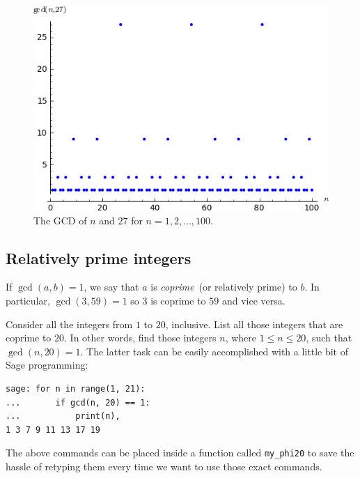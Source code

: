 \begin{figure}[!htbp]
\centering
\includegraphics[scale=1.0]{images/gcd-100}
\caption{The GCD of $n$ and $27$ for $n = 1, 2, \dots, 100$.}
\label{fig:number_theory:gcd_n_27}
\end{figure}



\subsection{Relatively prime integers}

If $\gcd(a,b) = 1$, we say that $a$ is
\emph{coprime}~(or relatively
prime) to $b$.  In particular,
$\gcd(3, 59) = 1$ so $3$ is coprime to $59$ and vice versa.

Consider all the integers from $1$ to $20$, inclusive.  List all those
integers that are coprime to $20$.  In other words, find those
integers $n$, where $1 \leq n \leq 20$, such that
$\gcd(n,20) = 1$. The latter task can be easily accomplished with a
little bit of Sage programming:

\begin{lstlisting}
sage: for n in range(1, 21):
...       if gcd(n, 20) == 1:
...           print(n),
1 3 7 9 11 13 17 19
\end{lstlisting}

The above commands can be placed inside a function called
\verb!my_phi20! to save the hassle of retyping them every time we want
to use those exact commands.


